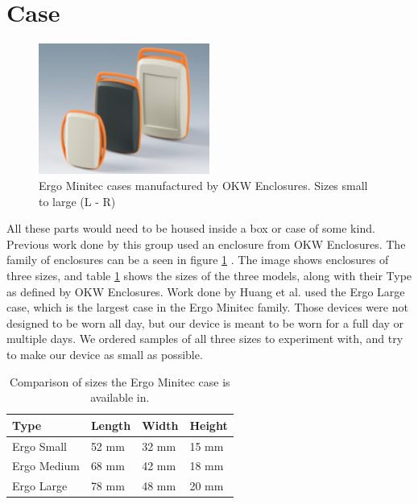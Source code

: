 \section{Case}
\label{Sec:Case}
\begin{figure}
\begin{center}
\includegraphics[width=0.5\textwidth]{images/OKWEN.jpg}
\caption{Ergo Minitec cases manufactured by OKW Enclosures. Sizes small to large (L - R)}
\label{Fig:OKWFam}
\end{center}
\end{figure}
All these parts would need to be housed inside a box or case of some kind.
Previous work done by this group used an enclosure from OKW Enclosures.
The family of enclosures can be a seen in figure \ref{Fig:OKWFam} \cite{Web:OKWPics}.
The image shows enclosures of three sizes,
and table \ref{Tab:OKWSize} shows the sizes of the three models,
along with their Type as defined by OKW Enclosures.
Work done by Huang et al. \cite{huang2013assessment} used the Ergo Large case,
which is the largest case in the Ergo Minitec family.
Those devices were not designed to be worn all day,
but our device is meant to be worn for a full day or multiple days.
We ordered samples of all three sizes to experiment with,
and try to make our device as small as possible.
\begin{table}[h]
\centering
\begin{tabular}{@{}llll@{}}
\toprule
Type & Length & Width & Height \\ \midrule
Ergo Small   & 52 mm  & 32 mm & 15 mm  \\
Ergo Medium   & 68 mm  & 42 mm & 18 mm  \\
Ergo Large   & 78 mm  & 48 mm & 20 mm  \\ \bottomrule
\end{tabular}
\caption{Comparison of sizes the Ergo Minitec case is available in.}
\label{Tab:OKWSize}
\end{table}

